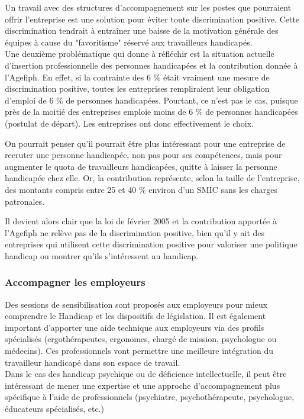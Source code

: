 Un travail avec des structures d'accompagnement sur les postes que pourraient offrir l'entreprise est une solution pour éviter toute discrimination positive. Cette discrimination tendrait à entraîner une baisse de la motivation générale des équipes à cause du "favoritisme" réservé aux travailleurs handicapés.\\

Une deuxième problématique qui donne à réfléchir est la situation actuelle d'insertion professionnelle des personnes handicapées et la contribution donnée à l'Agefiph. En effet, si la contrainte des 6 \% était vraiment une mesure de discrimination positive, toutes les entreprises rempliraient leur obligation d'emploi de 6 \% de personnes handicapées. Pourtant, ce n'est pas le cas, puisque près de la moitié des entreprises emploie moins de 6 \% de personnes handicapées (postulat de départ). Les entreprises ont donc effectivement le choix.

On pourrait penser qu'il pourrait être plus intéressant pour une entreprise de recruter une personne handicapée, non pas pour ses compétences, mais pour augmenter le quota de travailleurs handicapées, quitte à laisser la personne handicapée chez elle. Or, la contribution représente, selon la taille de l'entreprise, des montants compris entre 25 et 40 \% environ d'un SMIC sans les charges patronales.

Il devient alors clair que la loi de février 2005 et la contribution apportée à l'Agefiph ne relève pas de la discrimination positive, bien qu'il y ait des entreprises qui utilisent cette discrimination positive pour valoriser une politique handicap ou montrer qu'ils s'intéressent au handicap.

\subsubsection{Accompagner les employeurs}
Des sessions de sensibilisation sont proposés aux employeurs pour mieux comprendre le Handicap et les dispositifs de législation. Il est également important d'apporter une aide technique aux employeurs via des profils spécialisés (ergothérapeutes, ergonomes, chargé de mission, psychologue ou médecins). Ces professionnels vont permettre une meilleure intégration du travailleur handicapé dans son espace de travail.\\

Dans le cas des handicap psychique ou de déficience intellectuelle, il peut être intéressant de mener une expertise et une approche d'accompagnement plus spécifique à l'aide de professionnels (psychiatre, psychothérapeute, psychologue, éducateurs spécialisés, etc.)


